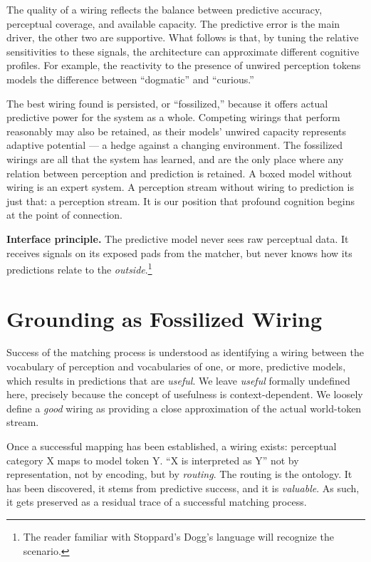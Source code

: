 \documentclass[12pt, a4paper]{article}
\begin{document}
The quality of a wiring reflects the balance between predictive
accuracy, perceptual coverage, and available capacity. The predictive
error is the main driver, the other two are supportive. What follows is
that, by tuning the relative sensitivities to these signals, the
architecture can approximate different cognitive profiles. For example,
the reactivity to the presence of unwired perception tokens models the
difference between ``dogmatic'' and ``curious.''

The best wiring found is persisted, or ``fossilized,'' because it offers
actual predictive power for the system as a whole. Competing wirings
that perform reasonably may also be retained, as their models' unwired
capacity represents adaptive potential --- a hedge against a changing
environment. The fossilized wirings are all that the system has learned,
and are the only place where any relation between perception and
prediction is retained. A boxed model without wiring is an expert
system. A perception stream without wiring to prediction is just that:
a perception stream. It is our position that profound cognition begins
at the point of connection.

\textbf{Interface principle.} The predictive model never sees raw
perceptual data. It receives signals on its exposed pads from the
matcher, but never knows how its predictions relate to the
\textit{outside}.\footnote{The reader familiar with Stoppard's Dogg's
language will recognize the scenario.}

\section{Grounding as Fossilized Wiring}

Success of the matching process is understood as identifying a wiring
between the vocabulary of perception and vocabularies of one, or more,
predictive models, which results in predictions that are
\textit{useful}. We leave \textit{useful} formally undefined here,
precisely because the concept of usefulness is context-dependent. We
loosely define a \textit{good} wiring as providing a close approximation
of the actual world-token stream.

Once a successful mapping has been established, a wiring exists:
perceptual category X maps to model token Y. ``X is interpreted as Y''
not by representation, not by encoding, but by \textit{routing}. The
routing is the ontology. It has been discovered, it stems from
predictive success, and it is \textit{valuable}. As such, it gets
preserved as a residual trace of a successful matching process.
\end{document}
